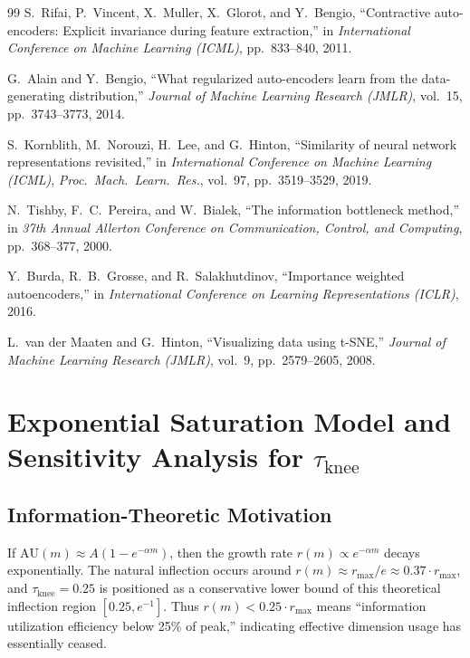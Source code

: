 \documentclass[12pt,a4paper]{article}
\begin{document}
\begin{thebibliography}{99}
S.~Rifai, P.~Vincent, X.~Muller, X.~Glorot, and Y.~Bengio,
``Contractive auto-encoders: Explicit invariance during feature extraction,''
in \textit{International Conference on Machine Learning (ICML)},
pp.~833--840, 2011.

G.~Alain and Y.~Bengio,
``What regularized auto-encoders learn from the data-generating distribution,''
\textit{Journal of Machine Learning Research (JMLR)}, vol.~15, pp.~3743--3773, 2014.

S.~Kornblith, M.~Norouzi, H.~Lee, and G.~Hinton,
``Similarity of neural network representations revisited,''
in \textit{International Conference on Machine Learning (ICML)},
\textit{Proc.~Mach.~Learn.~Res.}, vol.~97, pp.~3519--3529, 2019.

N.~Tishby, F.~C.~Pereira, and W.~Bialek,
``The information bottleneck method,''
in \textit{37th Annual Allerton Conference on Communication, Control, and Computing},
pp.~368--377, 2000.

Y.~Burda, R.~B.~Grosse, and R.~Salakhutdinov,
``Importance weighted autoencoders,''
in \textit{International Conference on Learning Representations (ICLR)}, 2016.

L.~van der Maaten and G.~Hinton,
``Visualizing data using t-SNE,''
\textit{Journal of Machine Learning Research (JMLR)}, vol.~9,
pp.~2579--2605, 2008.

\end{thebibliography}

\appendix

\section{Exponential Saturation Model and Sensitivity Analysis for $\tau_{\mathrm{knee}}$}\label{app:tau_knee}

\subsection*{Information-Theoretic Motivation}

If $\mathrm{AU}(m) \approx A(1 - e^{-\alpha m})$, then the growth rate $r(m) \propto e^{-\alpha m}$ decays exponentially.
The natural inflection occurs around $r(m) \approx r_\mathrm{max}/e \approx 0.37 \cdot r_\mathrm{max}$, and $\tau_{\mathrm{knee}} = 0.25$ is positioned as a conservative lower bound of this theoretical inflection region $[0.25, e^{-1}]$.
Thus $r(m) < 0.25 \cdot r_{\max}$ means ``information utilization efficiency below 25\% of peak,'' indicating effective dimension usage has essentially ceased.
\end{document}
